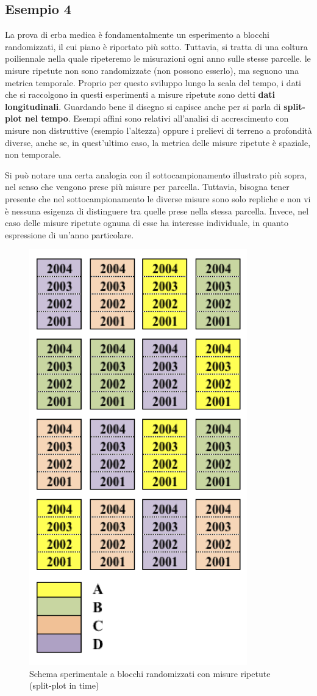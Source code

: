 \documentclass[a4paper,12pt,oneside]{book}
\theoremstyle{definition}
\theoremstyle{definition}
\theoremstyle{definition}
\theoremstyle{remark}
\begin{document}
\subsection{Esempio 4}\label{esempio-4-1}

La prova di erba medica è fondamentalmente un esperimento a blocchi
randomizzati, il cui piano è riportato più sotto. Tuttavia, si tratta di
una coltura poiliennale nella quale ripeteremo le misurazioni ogni anno
sulle stesse parcelle. le misure ripetute non sono randomizzate (non
possono esserlo), ma seguono una metrica temporale. Proprio per questo
sviluppo lungo la scala del tempo, i dati che si raccolgono in questi
esperimenti a misure ripetute sono detti \textbf{dati longitudinali}.
Guardando bene il disegno si capisce anche per si parla di
\textbf{split-plot nel tempo}. Esempi affini sono relativi all'analisi
di accrescimento con misure non distruttive (esempio l'altezza) oppure i
prelievi di terreno a profondità diverse, anche se, in quest'ultimo
caso, la metrica delle misure ripetute è spaziale, non temporale.

Si può notare una certa analogia con il sottocampionamento illustrato
più sopra, nel senso che vengono prese più misure per parcella.
Tuttavia, bisogna tener presente che nel sottocampionamento le diverse
misure sono solo repliche e non vi è nessuna esigenza di distinguere tra
quelle prese nella stessa parcella. Invece, nel caso delle misure
ripetute ognuna di esse ha interesse individuale, in quanto espressione
di un'anno particolare.

\begin{figure}

{\centering \includegraphics[width=0.55\linewidth]{_images/Mappa4} 

}

\caption{Schema sperimentale a blocchi randomizzati con misure ripetute (split-plot in time)}\label{fig:figName39}
\end{figure}
\end{document}
